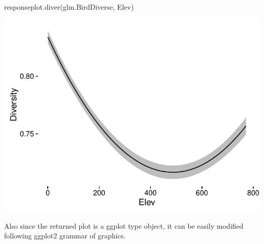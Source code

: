 \documentclass[article]{jss}
\begin{document}
\begin{CodeChunk}
\begin{CodeInput}
responseplot.diver(glm.BirdDiverse, Elev)
\end{CodeInput}


\begin{center}\includegraphics{diversityocc_files/figure-latex/unnamed-chunk-19-1} \end{center}

\end{CodeChunk}

Also since the returned plot is a ggplot type object, it can be easily
modified following ggplot2 grammar of graphics.
\end{document}
